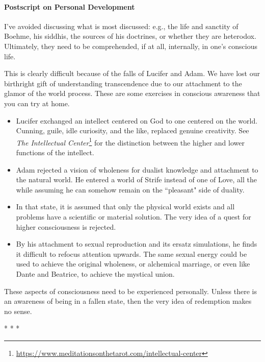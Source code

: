 \paragraph{Postscript on Personal Development}
I've avoided discussing what is most discussed: e.g., the life and sanctity of Boehme, his siddhis, the sources of his doctrines, or whether they are heterodox. Ultimately, they need to be comprehended, if at all, internally, in one's conscious life.

This is clearly difficult because of the falls of Lucifer and Adam. We have lost our birthright gift of understanding transcendence due to our attachment to the glamor of the world process. These are some exercises in conscious awareness that you can try at home.

\begin{itemize}
\item Lucifer exchanged an intellect centered on God to one centered on the world. Cunning, guile, idle curiosity, and the like, replaced genuine creativity. See \textit{The Intellectual Center}\footnote{\url{https://www.meditationsonthetarot.com/intellectual-center}} for the distinction between the higher and lower functions of the intellect. 
\item Adam rejected a vision of wholeness for dualist knowledge and attachment to the natural world. He entered a world of Strife instead of one of Love, all the while assuming he can somehow remain on the ``pleasant" side of duality. 
\item In that state, it is assumed that only the physical world exists and all problems have a scientific or material solution. The very idea of a quest for higher consciousness is rejected. 
\item By his attachment to sexual reproduction and its ersatz simulations, he finds it difficult to refocus attention upwards. The same sexual energy could be used to achieve the original wholeness, or alchemical marriage, or even like Dante and Beatrice, to achieve the mystical union. 
\end{itemize}
These aspects of consciousness need to be experienced personally. Unless there is an awareness of being in a fallen state, then the very idea of redemption makes no sense.


\begin{center}* * *\end{center}

